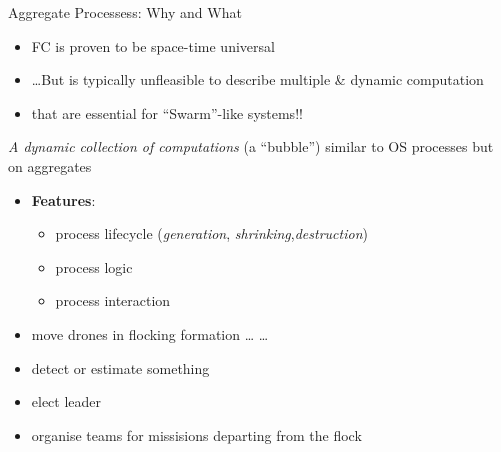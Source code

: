 \documentclass[8pt, aspectratio=169, handout]{beamer}
\begin{document}
\begin{frame}[allowframebreaks]{Aggregate Processess: Why and What}
  \begin{card}[Why?]
    \begin{itemize}
      \item FC is proven to be space-time universal
      \item \dots But is typically unfleasible to describe multiple \& dynamic computation
      \item[\faArrowRight] that are essential for ``Swarm''-like systems!! 
    \end{itemize}
  \end{card}
  \begin{card}
    \emph{A dynamic collection of computations} (a ``bubble'') \faArrowRight similar to OS processes but on aggregates
    \begin{itemize}
      \item \textbf{Features}:
      \begin{itemize}
        \item process lifecycle (\emph{generation}, \emph{shrinking},\emph{destruction})
        \item process logic
        \item process interaction
      \end{itemize}
    \end{itemize}
  \end{card}
  \begin{card}
    \begin{itemize}
      \item move drones in flocking formation \dots {} \dots
      \item detect or estimate something
      \item elect leader
      \item organise teams for missisions departing from the flock
    \end{itemize}
  \end{card}
  \centering
  \begin{multicols*}{3}
  \end{multicols*}
\end{frame}
\end{document}
